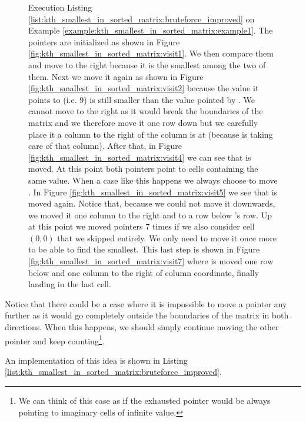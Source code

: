 \begin{figure}
     \caption[Execution Listing \ref{list:kth_smallest_in_sorted_matrix:bruteforce_improved} on Example \ref{example:kth_smallest_in_sorted_matrix:example1}]{Execution Listing \ref{list:kth_smallest_in_sorted_matrix:bruteforce_improved} on Example \ref{example:kth_smallest_in_sorted_matrix:example1}. The pointers are initialized as shown in Figure \ref{fig:kth_smallest_in_sorted_matrix:visit1}. We then compare them and move  to the right because it is the smallest among the two of them. Next we move it again as shown in Figure \ref{fig:kth_smallest_in_sorted_matrix:visit2} because the value it points to (i.e. $9$) is still smaller than the value pointed by . We cannot move  to the right as it would break the boundaries of the matrix and we therefore move it one row down but we carefully place it a column to the right of the column  is at (because  is taking care of that column). After that, in Figure \ref{fig:kth_smallest_in_sorted_matrix:visit4} we can see that   is moved. At this point both pointers point to cells containing the same value. When a case like this happens we always choose to move . In Figure \ref{fig:kth_smallest_in_sorted_matrix:visit5} we see that  is moved again. Notice that, because we could not move it downwards, we moved it one column to the right and to a row below 's row. Up at this point we moved pointers $7$ times if we also consider cell $(0,0)$ that we skipped entirely. We only need to move it once more to be able to find the  smallest. This last step is shown in Figure \ref{fig:kth_smallest_in_sorted_matrix:visit7} where  is moved one row below and one column to the right of  column coordinate, finally landing in the last cell.}
      \label{fig:kth_smallest_in_sorted_matrix:visitall}
\end{figure}

Notice that there could be a case where it is impossible to move a pointer any further as it would go completely outside the boundaries of the matrix in both directions. When this happens, we should simply continue moving the other pointer and keep counting\footnote{We can think of this case as if the exhausted pointer would be always pointing to imaginary cells of infinite value.}.

An implementation of this idea is shown in Listing \ref{list:kth_smallest_in_sorted_matrix:bruteforce_improved}.

